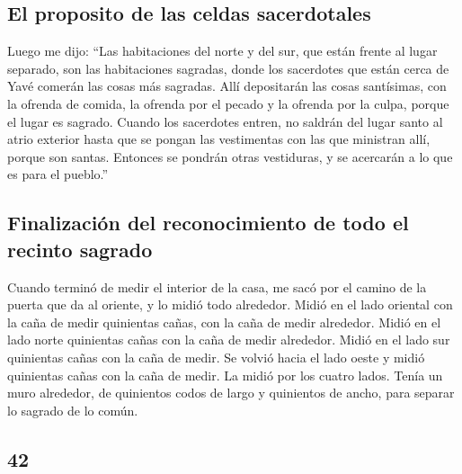 \begin{paracol}{2}
\hypertarget{el-proposito-de-las-celdas-sacerdotales}{%
\subsection{El proposito de las celdas
sacerdotales}\label{el-proposito-de-las-celdas-sacerdotales}}

 Luego me dijo: ``Las habitaciones del norte y del sur,
que están frente al lugar separado, son las habitaciones sagradas, donde
los sacerdotes que están cerca de Yavé comerán las cosas más sagradas.
Allí depositarán las cosas santísimas, con la ofrenda de comida, la
ofrenda por el pecado y la ofrenda por la culpa, porque el lugar es
sagrado.  Cuando los sacerdotes entren, no saldrán del
lugar santo al atrio exterior hasta que se pongan las vestimentas con
las que ministran allí, porque son santas. Entonces se pondrán otras
vestiduras, y se acercarán a lo que es para el pueblo.''

\hypertarget{finalizaciuxf3n-del-reconocimiento-de-todo-el-recinto-sagrado}{%
\subsection{Finalización del reconocimiento de todo el recinto
sagrado}\label{finalizaciuxf3n-del-reconocimiento-de-todo-el-recinto-sagrado}}

 Cuando terminó de medir el interior de la casa, me sacó
por el camino de la puerta que da al oriente, y lo midió todo alrededor.
 Midió en el lado oriental con la caña de medir
quinientas cañas, con la caña de medir alrededor.  Midió
en el lado norte quinientas cañas con la caña de medir alrededor.
 Midió en el lado sur quinientas cañas con la caña de
medir.  Se volvió hacia el lado oeste y midió quinientas
cañas con la caña de medir.  La midió por los cuatro
lados. Tenía un muro alrededor, de quinientos codos de largo y
quinientos de ancho, para separar lo sagrado de lo común.

\switchcolumn
\begin{otherlanguage}{english}

\hypertarget{section-83}{%
\section{42}\label{section-83}}


\end{otherlanguage}
\end{paracol}
